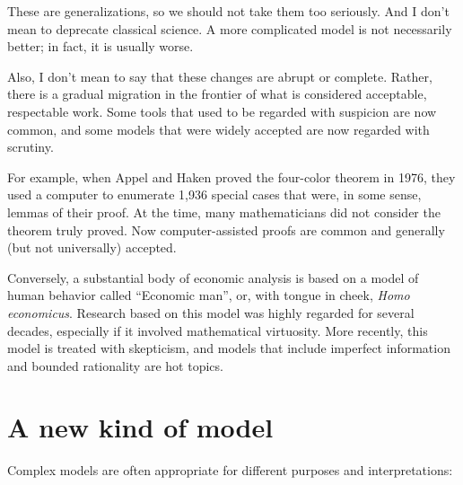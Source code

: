 \documentclass[12pt]{book}
\theoremstyle{exercise}
\begin{document}
These are generalizations, so we should not take them too seriously.
And I don't mean to deprecate classical science.  A more complicated
model is not necessarily better; in fact, it is usually worse.

Also, I don't mean to say that these changes are abrupt or complete.
Rather, there is a gradual migration in the frontier of what is
considered acceptable, respectable work.  Some tools that used to be
regarded with suspicion are now common, and some models that were
widely accepted are now regarded with scrutiny.

For example, when Appel and Haken proved the four-color theorem in
1976, they used a computer to enumerate 1,936 special cases that were,
in some sense, lemmas of their proof.  At the time, many
mathematicians did not consider the theorem truly proved.  Now
computer-assisted proofs are common and generally (but not
universally) accepted.


Conversely, a substantial body of economic analysis is based on a
model of human behavior called ``Economic man'', or, with tongue in
cheek, {\it Homo economicus}.  Research based on this model was
highly regarded for several decades, especially if it involved
mathematical virtuosity.  More recently, this model is treated with
skepticism, and models that include imperfect information and
bounded rationality are hot topics.



\section{A new kind of model}

Complex models are often appropriate for different purposes and
interpretations:

\end{document}
